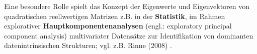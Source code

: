 \medskip
\noindent
Eine besondere Rolle spielt das Konzept der Eigenwerte und
Eigenvektoren von quadratischen reellwertigen Matrizen z.B.
in der {\bf Statistik}, im Rahmen explorativer
{\bf Hauptkomponentenanalysen} (engl.: exploratory principal 
component analysis) multivariater Datens\"atze
zur Identifikation von dominanten datenintrinsischen Strukturen;
vgl. z.B. Rinne (2008) .

